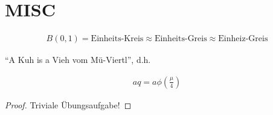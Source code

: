 \documentclass{article}
\begin{document}
\section{MISC}

\begin{theorem}

  \begin{align*}
    B(0, 1)
    =
    \text{Einheits-Kreis}
    \approx
    \text{Einheits-Greis}
    \approx
    \text{Einheiz-Greis}
  \end{align*}

\end{theorem}

\begin{theorem}

  \enquote{A Kuh is a Vieh vom Mü-Viertl}, d.h.

  \begin{align}
    aq = a \phi \left( \frac{\mu}{4} \right)
  \end{align}

\end{theorem}

\begin{proof}
  Triviale Übungsaufgabe!
\end{proof}
\end{document}
